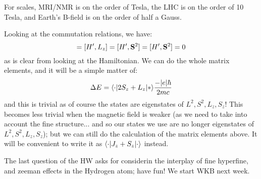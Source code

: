 For scales, MRI/NMR is on the order of Tesla, the LHC is on the order of 10 Tesla, and Earth's B-field is on the order of half a Gauss.

Looking at the commutation relations, we have:
\begin{equation}
    [H', \v{L}^2] = [H', L_z] = [H', \v{S}^2] = [H', \v{S}^2] = 0
\end{equation}
as is clear from looking at the Hamiltonian. We can do the whole matrix elements, and it will be a simple matter of:
\begin{equation}
    \Delta E = \langle \cdot \rvert2S_z + L_z\lvert * \rangle \frac{-\lvert e \rvert\hbar}{2mc}
\end{equation}
and this is trivial as of course the states are eigenstates of $L^2, S^2, L_z, S_z$! This becomes less trivial when the magnetic field is weaker (as we need to take into account the fine structure... and so our states we use are no longer eigenstates of $L^2, S^2, L_z, S_z$); but we can still do the calculation of the matrix elements above. It will be convenient to write it as $\langle \cdot \rvert J_z + S_z\lvert \cdot \rangle$ instead.

The last question of the HW asks for considerin the interplay of fine hyperfine, and zeeman effects in the Hydrogen atom; have fun! We start WKB next week.